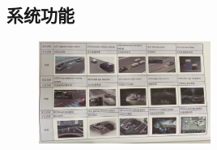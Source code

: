 \subsection{系统功能}
	\begin{figure}[htbp]
		\centering
		\includegraphics[width=0.5\textwidth]{5-27}
	\end{figure}

